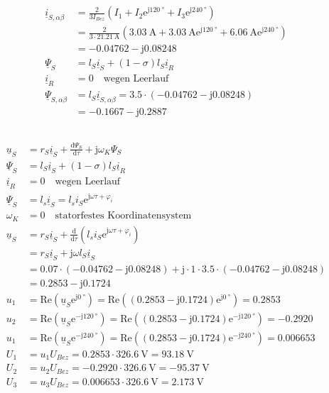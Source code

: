 \documentclass[11pt,a4paper]{scrartcl}
\newcommand{\mybr}[1]{\left(#1\right)}
\renewcommand{\j}{\mathrm{j}}
\renewcommand{\u}{\underline{u}}
\renewcommand{\i}{\underline{i}}
\newcommand{\PPsi}{\underline{\Psi}}
\newcommand{\0}{_{\mybr{0}}}
\newcommand{\1}{_{\mybr{1}}}
\newcommand{\2}{_{\mybr{2}}}
\renewcommand{\e}{\mathrm{e}}
\renewcommand{\d}{\mathrm{d}}
\renewcommand{\Re}{\mathrm{Re}}
\begin{document}
\section{}
\subsection{}
\begin{align}
	\i_{S,\alpha\beta}&=\frac{2}{3I_{Bez}}\mybr{I_1+I_2\e^{\j\SI{120}{\degree}}+I_3\e^{\j\SI{240}{\degree}}}\\
	&=\frac{2}{3\cdot\SI{21.21}{\ampere}}\mybr{\SI{3.03}{\ampere}+\SI{3.03}{\ampere}\e^{\j\SI{120}{\degree}}+\SI{6.06}{\ampere}\e^{\j\SI{240}{\degree}}}\\
	&=\num{-0.04762}-\j\num{0.08248}\\
	\PPsi_S&=l_S\i_S+\mybr{1-\sigma}l_S\i_R\\
	\i_R&=0\quad \text{wegen Leerlauf}\\
	\PPsi_{S,\alpha\beta}&=l_S\i_{S,\alpha\beta}=\num{3.5}\cdot\mybr{\num{-0.04762}-\j\num{0.08248}}\\
	&=\num{-0.1667}-\j\num{0.2887}
\end{align}

\subsection{}
\begin{align}
	\u_S&=r_S\i_S+\frac{\d\Psi_S}{\d\tau}+\j\omega_K\Psi_S\\
	\PPsi_S&=l_S\i_S+\mybr{1-\sigma}l_S\i_R\\
	\i_R&=0\quad \text{wegen Leerlauf}\\
	\PPsi_S&=l_s\i_S=l_s i_S\e^{\j\omega\tau+\varphi_i}\\
	\omega_K&=0\quad\text{statorfestes Koordinatensystem}\\
	\u_S&=r_S\i_S+\frac{\d}{\d\tau}\mybr{l_s i_S\e^{\j\omega\tau+\varphi_i}}\\
	&=r_S\i_S+\j\omega l_S \i_S\\
	&=\num{0.07}\cdot\mybr{\num{-0.04762}-\j\num{0.08248}}+\j\cdot 1\cdot\num{3.5}\cdot\mybr{\num{-0.04762}-\j\num{0.08248}}\\
	&=\num{0.2853}-\j\num{0.1724}\\
	u_1&=\Re\mybr{\u_S\e^{\j\SI{0}{\degree}}}=\Re\mybr{\mybr{\num{0.2853}-\j\num{0.1724}}\e^{\j\SI{0}{\degree}}}=\num{0.2853}\\
	u_2&=\Re\mybr{\u_S\e^{-\j\SI{120}{\degree}}}=\Re\mybr{\mybr{\num{0.2853}-\j\num{0.1724}}\e^{-\j\SI{120}{\degree}}}=\num{-0.2920}\\
	u_1&=\Re\mybr{\u_S\e^{-\j\SI{240}{\degree}}}=\Re\mybr{\mybr{\num{0.2853}-\j\num{0.1724}}\e^{-\j\SI{240}{\degree}}}=\num{0.006653}\\
	U_1&=u_1U_{Bez}=\num{0.2853}\cdot\SI{326.6}{\volt}=\SI{93.18}{\volt}\\
	U_2&=u_2U_{Bez}=\num{-0.2920}\cdot\SI{326.6}{\volt}=\SI{-95.37}{\volt}\\
	U_3&=u_3U_{Bez}=\num{0.006653}\cdot\SI{326.6}{\volt}=\SI{2.173}{\volt}
\end{align}
\end{document}
